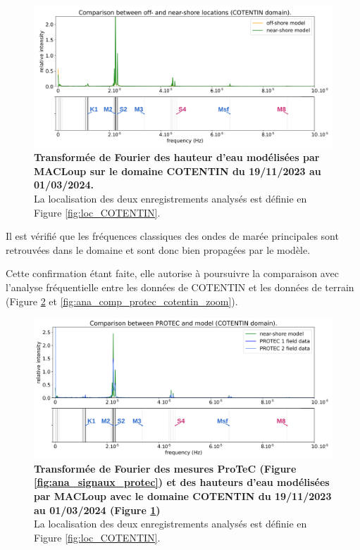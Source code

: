 \documentclass[10pt,a4paper,titlepage]{article}
\begin{document}
\begin{figure}[h!]
	\centering
	\includegraphics[scale=0.4]{../images/post_traitement/COTENTIN_analyse_off-near-shore.pdf}
	\caption{
		\textbf{Transformée de Fourier des hauteur d'eau modélisées par MACLoup sur le domaine COTENTIN du 19/11/2023 au 01/03/2024.}\\
		La localisation des deux enregistrements analysés est définie en Figure \ref{fig:loc_COTENTIN}.
	}
	\label{fig:ana_COTENTIN}
\end{figure}

Il est vérifié que les fréquences classiques des ondes de marée principales sont retrouvées dans le domaine et sont donc bien propagées par le modèle.

Cette confirmation étant faite, elle autorise à poursuivre la comparaison avec l'analyse fréquentielle entre les données de COTENTIN et les données de terrain (Figure \ref{fig:ana_comp_protec_cotentin} et \ref{fig:ana_comp_protec_cotentin_zoom}).

\begin{figure}[H]
	\centering
	\includegraphics[scale=0.4]{../images/post_traitement/COTENTIN_analyse_near-shore.pdf}
	\caption{
		\textbf{Transformée de Fourier des mesures ProTeC (Figure \ref{fig:ana_signaux_protec}) et des hauteurs d'eau modélisées par MACLoup avec le domaine COTENTIN du 19/11/2023 au 01/03/2024 (Figure \ref{fig:ana_COTENTIN})}\\
		La localisation des deux enregistrements analysés est définie en Figure \ref{fig:loc_COTENTIN}.
	}
	\label{fig:ana_comp_protec_cotentin}
\end{figure}
\end{document}
